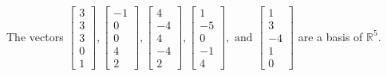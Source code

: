 \begin{exercise}
\begin{exerciseStatement}
  \end{exerciseStatement}
  \begin{exerciseAnswer}
   The vectors \(\left[\begin{array}{r}
3 \\
3 \\
3 \\
0 \\
1
\end{array}\right] , \left[\begin{array}{r}
-1 \\
0 \\
0 \\
4 \\
2
\end{array}\right] , \left[\begin{array}{r}
4 \\
-4 \\
4 \\
-4 \\
2
\end{array}\right] , \left[\begin{array}{r}
1 \\
-5 \\
0 \\
-1 \\
4
\end{array}\right] , \text{ and } \left[\begin{array}{r}
1 \\
3 \\
-4 \\
1 \\
0
\end{array}\right]\) 
  	 are  a basis of \(\mathbb{R}^5\).
  


  \end{exerciseAnswer}
\end{exercise}